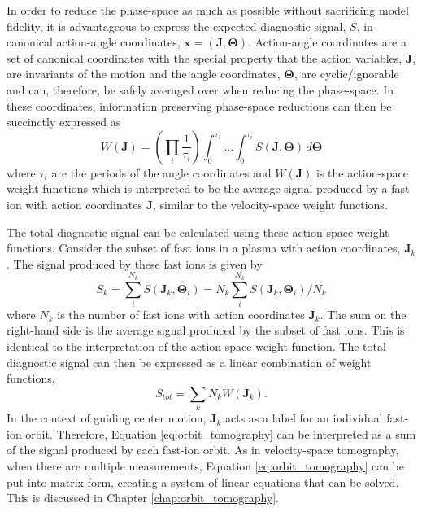 In order to reduce the phase-space as much as possible without sacrificing model fidelity, it is advantageous to express the expected diagnostic signal, $S$, in canonical action-angle coordinates, $\mathbf{x} = (\mathbf{J},\mathbf{\Theta})$.
Action-angle coordinates are a set of canonical coordinates with the special property that the action variables, $\mathbf{J}$, are invariants of the motion and the angle coordinates, $\mathbf{\Theta}$, are cyclic/ignorable and can, therefore, be safely averaged over when reducing the phase-space. 
In these coordinates, information preserving phase-space reductions can then be succinctly expressed as
\begin{equation}\label{eq:action_angle_reduction}
    W(\mathbf{J}) = \left( \prod_i \frac{1}{\tau_i} \right) \int_0^{\tau_1}\ldots\int_0^{\tau_i} S(\mathbf{J},\mathbf{\Theta})\, d\mathbf{\Theta}
\end{equation}
where $\tau_i$ are the periods of the angle coordinates and $W(\mathbf{J})$ is the action-space weight functions which is interpreted to be the average signal produced by a fast ion with action coordinates $\mathbf{J}$, similar to the velocity-space weight functions. 

The total diagnostic signal can be calculated using these action-space weight functions. Consider the subset of fast ions in a plasma with action coordinates, $\mathbf{J}_k$.
The signal produced by these fast ions is given by
\begin{equation}\label{eq:orbit_tomography_discrete}
    S_k = \sum_i^{N_k} S(\mathbf{J}_k,\mathbf{\Theta}_i) = N_k \sum_i^{N_k} S(\mathbf{J}_k,\mathbf{\Theta}_i)/N_k
\end{equation}
where $N_k$ is the number of fast ions with action coordinates $\mathbf{J}_k$.
The sum on the right-hand side is the average signal produced by the subset of fast ions. This is identical to the interpretation of the action-space weight function.
The total diagnostic signal can then be expressed as a linear combination of weight functions,
\begin{equation}\label{eq:orbit_tomography}
    S_{tot} = \sum_k N_k W(\mathbf{J}_k) .
\end{equation}
In the context of guiding center motion, $\mathbf{J}_k$ acts as a label for an individual fast-ion orbit. Therefore, Equation \ref{eq:orbit_tomography} can be interpreted as a sum of the signal produced by each fast-ion orbit.
As in velocity-space tomography, when there are multiple measurements, Equation \ref{eq:orbit_tomography} can be put into matrix form, creating a system of linear equations that can be solved. This is discussed in Chapter \ref{chap:orbit_tomography}.

